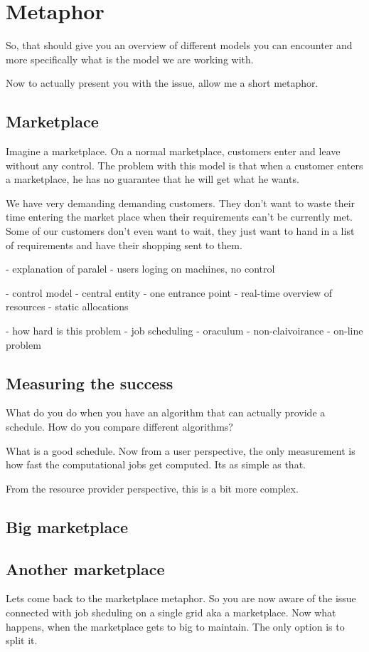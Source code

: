 \documentclass[10pt]{article}
\begin{document}
\section{Metaphor}

So, that should give you an overview of different models you can encounter and
more specifically what is the model we are working with.

Now to actually present you with the issue, allow me a short metaphor.

\subsection{Marketplace}

Imagine a marketplace. On a normal marketplace, customers enter and leave
without any control. The problem with this model is that when a customer enters
a marketplace, he has no guarantee that he will get what he wants.

We have very demanding demanding customers. They don't want to waste their time
entering the market place when their requirements can't be currently met. Some
of our customers don't even want to wait, they just want to hand in a list of
requirements and have their shopping sent to them.

- explanation of paralel
 - users loging on machines, no control

- control model
  - central entity - one entrance point
  - real-time overview of resources
  - static allocations

- how hard is this problem
  - job scheduling
  - oraculum
  - non-claivoirance
  - on-line problem

\subsection{Measuring the success}

What do you do when you have an algorithm that can actually provide a schedule.
How do you compare different algorithms?

What is a good schedule. Now from a user perspective, the only measurement is
how fast the computational jobs get computed. Its as simple as that.

From the resource provider perspective, this is a bit more complex. 

\subsection{Big marketplace}

\subsection{Another marketplace}

Lets come back to the marketplace metaphor. So you are now aware of the issue
connected with job sheduling on a single grid aka a marketplace.  Now what
happens, when the marketplace gets to big to maintain. The only option is to split it.
\end{document}
